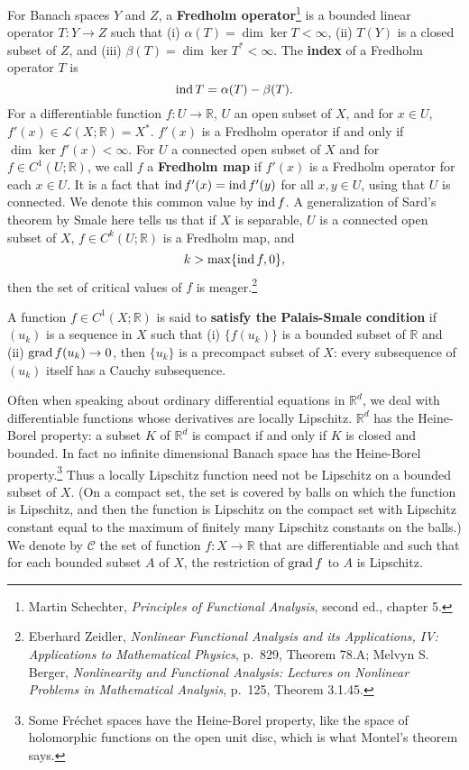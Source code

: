 \documentclass{article}
\newcommand{\grad}{\ensuremath\mathrm{grad}\,}
\newcommand{\ind}{\ensuremath\mathrm{ind}\,}
\theoremstyle{definition}
\theoremstyle{definition}
\begin{document}
For Banach spaces $Y$ and $Z$, a \textbf{Fredholm operator}\footnote{Martin Schechter, {\em Principles of Functional Analysis},
second ed., chapter 5.} is a bounded linear operator $T:Y \to Z$ such that (i) $\alpha(T) = \dim \ker T<\infty$, (ii) $T(Y)$ is a closed subset of $Z$,
and (iii)
$\beta(T) = \dim \ker T^*<\infty$. The \textbf{index} of a Fredholm operator $T$ is
\[
\ind T = \alpha(T) - \beta(T).
\]
For a differentiable function $f:U \to \mathbb{R}$, $U$ an open subset of $X$, and for $x \in U$,
$f'(x) \in \mathscr{L}(X;\mathbb{R})=X^*$. $f'(x)$ is a Fredholm operator if and only
if $\dim \ker f'(x) < \infty$. 
For $U$ a connected open subset of $X$ and for $f \in C^1(U;\mathbb{R})$, we call $f$ a \textbf{Fredholm map} if
$f'(x)$ is a Fredholm operator for each $x \in U$. It is a fact that $\ind f'(x) = \ind f'(y)$ for all $x,y \in U$, using that $U$ is connected.
We denote this common value by $\ind f$. 
A generalization of Sard's theorem by Smale here tells us that if $X$ is separable, $U$ is a connected
open subset of $X$,
$f \in C^k(U;\mathbb{R})$ is a Fredholm map, and 
\[
k > \max\{\ind f, 0\},
\]
then the set of critical values of $f$ is meager.\footnote{Eberhard Zeidler,
{\em Nonlinear Functional Analysis and its Applications, IV: Applications to Mathematical Physics}, p.~829, Theorem 78.A;
Melvyn S. Berger, {\em Nonlinearity and Functional Analysis: Lectures on Nonlinear Problems in Mathematical Analysis},
p.~125, Theorem 3.1.45.}


A function $f \in C^1(X;\mathbb{R})$ is said to \textbf{satisfy the Palais-Smale condition} if 
 $(u_k)$ is a sequence in $X$ such that (i) $\{f(u_k)\}$ is a bounded subset of $\mathbb{R}$ and (ii)
 $\grad f(u_k) \to 0$, then $\{u_k\}$ is a precompact subset of $X$: every subsequence of $(u_k)$ itself has a Cauchy subsequence. 

Often when speaking about ordinary differential equations in $\mathbb{R}^d$, we deal with differentiable functions whose derivatives
are locally Lipschitz.  $\mathbb{R}^d$ has the Heine-Borel property: a subset $K$ of $\mathbb{R}^d$ is compact if and only if $K$ is closed
and bounded.  In fact no infinite dimensional Banach space has the Heine-Borel property.\footnote{Some Fr\'echet spaces have the Heine-Borel property, like the space
of holomorphic functions on the open unit disc, which is what Montel's theorem says.}
Thus a locally Lipschitz function need not be Lipschitz on a bounded subset of $X$. (On a compact set, the set is covered by balls on which the function is Lipschitz,
and then the function is Lipschitz on the compact set with Lipschitz constant equal to the maximum of finitely many Lipschitz constants on the balls.)
We denote by $\mathcal{C}$ the set of function $f:X \to \mathbb{R}$ that are differentiable and such that for each bounded subset $A$ of $X$, 
the restriction of $\grad f$ to $A$ is Lipschitz.
\end{document}
